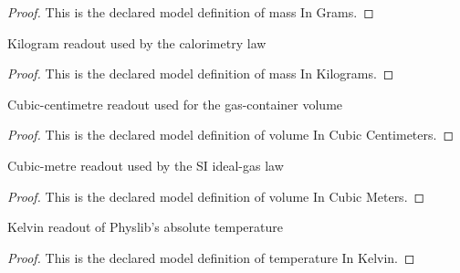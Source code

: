 \begin{proof}
  This is the declared model definition of mass In Grams.
\end{proof}
\begin{definition}
  \label{def:physics:phyx-mini-0406:phyxminiproblems-problemphyxmini0406-massinkilograms}
  Kilogram readout used by the calorimetry law
\end{definition}
\begin{proof}
  This is the declared model definition of mass In Kilograms.
\end{proof}
\begin{definition}
  \label{def:physics:phyx-mini-0406:phyxminiproblems-problemphyxmini0406-volumeincubiccentimeters}
  Cubic-centimetre readout used for the gas-container volume
\end{definition}
\begin{proof}
  This is the declared model definition of volume In Cubic Centimeters.
\end{proof}
\begin{definition}
  \label{def:physics:phyx-mini-0406:phyxminiproblems-problemphyxmini0406-volumeincubicmeters}
  Cubic-metre readout used by the SI ideal-gas law
\end{definition}
\begin{proof}
  This is the declared model definition of volume In Cubic Meters.
\end{proof}
\begin{definition}
  \label{def:physics:phyx-mini-0406:phyxminiproblems-problemphyxmini0406-temperatureinkelvin}
  Kelvin readout of Physlib's absolute temperature
\end{definition}
\begin{proof}
  This is the declared model definition of temperature In Kelvin.
\end{proof}
